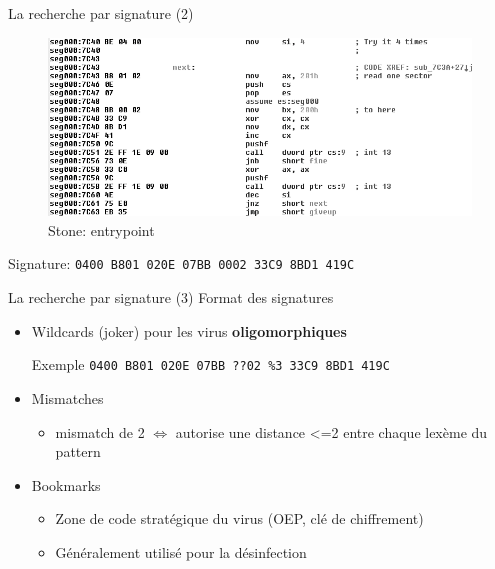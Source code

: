 \documentclass{beamer}
\begin{document}
\begin{frame}{La recherche par signature (2)}
\begin{figure}[!ht]
\includegraphics[scale=0.35]{stone.png}
\center
\caption{Stone: entrypoint}
\end{figure}
Signature: \texttt{0400 B801 020E 07BB 0002 33C9 8BD1 419C}
\end{frame}


\begin{frame}{La recherche par signature (3)}
Format des signatures
\begin{itemize}
\item Wildcards (joker) pour les virus \textbf{oligomorphiques}
\begin{exampleblock}{Exemple}
\texttt{0400 B801 020E 07BB ??02 \%3 33C9 8BD1 419C}
\end{exampleblock}
\item Mismatches
\begin{itemize}
\item mismatch de 2 $\Leftrightarrow$ autorise une distance <=2 entre chaque lexème du pattern
\end{itemize}
\item Bookmarks
\begin{itemize}
\item Zone de code stratégique du virus (OEP, clé de chiffrement)
\item Généralement utilisé pour la désinfection
\end{itemize}
\end{itemize}
\end{frame}
\end{document}
